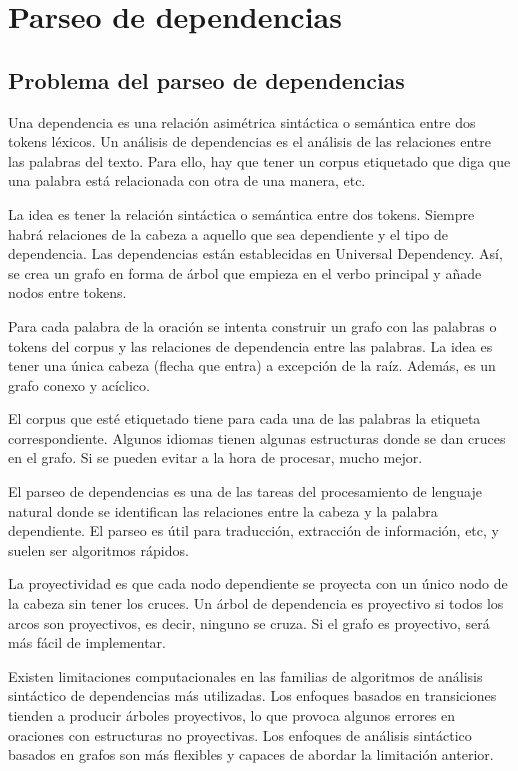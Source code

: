 \chapter{Parseo de dependencias}
\section{Problema del parseo de dependencias}
Una dependencia es una relación asimétrica sintáctica o semántica entre dos tokens léxicos. Un análisis de dependencias es el análisis de las relaciones entre las palabras del texto. Para ello, hay que tener un corpus etiquetado que diga que una palabra está relacionada con otra de una manera, etc. 

La idea es tener la relación sintáctica o semántica entre dos tokens. Siempre habrá relaciones de la cabeza a aquello que sea dependiente y el tipo de dependencia. Las dependencias están establecidas en Universal Dependency. Así, se crea un grafo en forma de árbol que empieza en el verbo principal y añade nodos entre tokens. 

Para cada palabra de la oración se intenta construir un grafo con las palabras o tokens del corpus y las relaciones de dependencia entre las palabras. La idea es tener una única cabeza (flecha que entra) a excepción de la raíz. Además, es un grafo conexo y acíclico. 

El corpus que esté etiquetado tiene para cada una de las palabras la etiqueta correspondiente. Algunos idiomas tienen algunas estructuras donde se dan cruces en el grafo. Si se pueden evitar a la hora de procesar, mucho mejor. 

El parseo de dependencias es una de las tareas del procesamiento de lenguaje natural donde se identifican las relaciones entre la cabeza y la palabra dependiente. El parseo es útil para traducción, extracción de información, etc, y suelen ser algoritmos rápidos. 

La proyectividad es que cada nodo dependiente se proyecta con un único nodo de la cabeza sin tener los cruces. Un árbol de dependencia es proyectivo si todos los arcos son proyectivos, es decir, ninguno se cruza. Si el grafo es proyectivo, será más fácil de implementar.

Existen limitaciones computacionales en las familias de algoritmos de análisis sintáctico de dependencias más utilizadas. Los enfoques basados en transiciones tienden a producir árboles proyectivos, lo que provoca algunos errores en oraciones con estructuras no proyectivas. Los enfoques de análisis sintáctico basados en grafos son más flexibles y capaces de abordar la limitación anterior.

